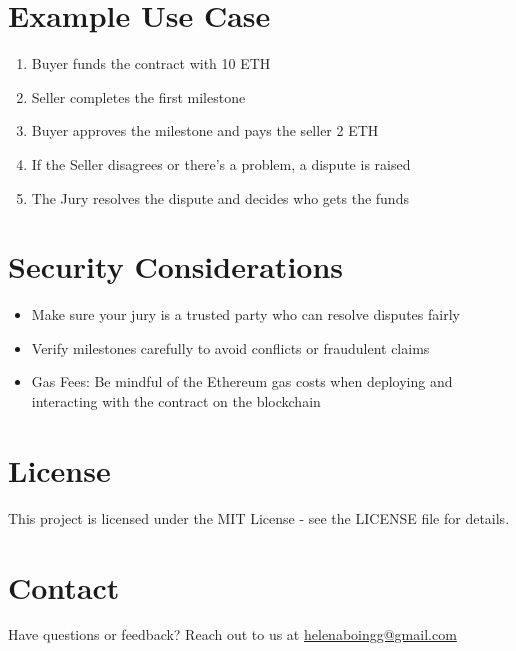 \documentclass{article}
\begin{document}
\section{Example Use Case}
\begin{enumerate}
    \item Buyer funds the contract with 10 ETH
    \item Seller completes the first milestone
    \item Buyer approves the milestone and pays the seller 2 ETH
    \item If the Seller disagrees or there's a problem, a dispute is raised
    \item The Jury resolves the dispute and decides who gets the funds
\end{enumerate}

\section{Security Considerations}
\begin{itemize}
    \item Make sure your jury is a trusted party who can resolve disputes fairly
    \item Verify milestones carefully to avoid conflicts or fraudulent claims
    \item Gas Fees: Be mindful of the Ethereum gas costs when deploying and interacting with the contract on the blockchain
\end{itemize}

\section{License}
This project is licensed under the MIT License - see the LICENSE file for details.

\section{Contact}
Have questions or feedback? Reach out to us at \href{mailto:helenaboingg@gmail.com}{helenaboingg@gmail.com}
\end{document}
